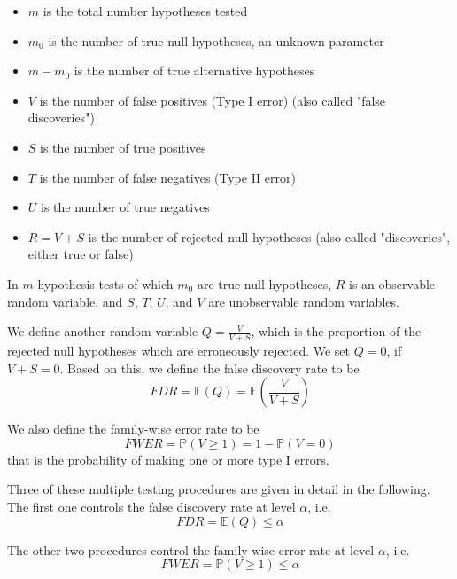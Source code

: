 \documentclass{beamer}
\begin{document}
\begin{frame}
	\begin{itemize}
		\item $m$ is the total number hypotheses tested
		\item $m_0$ is the number of true null hypotheses, an unknown parameter
		\item $m - m_0$ is the number of true alternative hypotheses
		\item $V$ is the number of false positives (Type I error) (also called "false discoveries")
		\item $S$ is the number of true positives
		\item $T$ is the number of false negatives (Type II error)
		\item $U$ is the number of true negatives
		\item $R = V + S$ is the number of rejected null hypotheses (also called "discoveries", either true or false)
	\end{itemize}
	In $m$ hypothesis tests of which $m_0$ are true null hypotheses, $R$ is an observable random variable, and $S$, $T$, $U$, and $V$ are unobservable random variables.
\end{frame}

\begin{frame}
	We define another random variable $Q = \frac{V}{V + S}$, which is the proportion of the rejected null hypotheses which are erroneously rejected. We set $Q = 0$, if $V + S = 0$. Based on this, we define the false discovery rate to be
	\begin{equation*}
		FDR = \mathbb{E}(Q) = \mathbb{E} \left( \frac{V}{V + S} \right)
	\end{equation*}
	
	We also define the family-wise error rate to be
	\begin{equation*}
		FWER = \mathbb{P}( V \geq 1 ) = 1 - \mathbb{P}( V = 0 )
	\end{equation*}
	that is the probability of making one or more type I errors.
\end{frame}

\begin{frame}
	Three of these multiple testing procedures are given in detail in the following. The first one controls the false discovery rate at level $\alpha$, i.e.
	\begin{equation*}
		FDR = \mathbb{E}(Q) \leq \alpha
	\end{equation*}
	
	The other two procedures control the family-wise error rate at level $\alpha$, i.e.
	\begin{equation*}
		FWER = \mathbb{P}( V \geq 1 ) \leq \alpha
	\end{equation*}
\end{frame}
\end{document}
